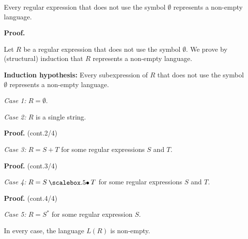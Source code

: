 \begin{frame}
  \begin{lemma}
    Every regular expression that does not use the symbol $\emptyset$
    represents a non-empty language.
  \end{lemma}

  {\bf Proof.}
  
  \pause

  Let $R$ be a regular expression that does not use the symbol
  $\emptyset$.  We prove by (structural) induction that $R$ represents
  a non-empty language.

  \pause

  {\bf Induction hypothesis:} Every subexpression of $R$ that does not
  use the symbol $\emptyset$ represents a non-empty language.
  
  \pause

  {\em Case 1:} $R=\emptyset$.
  \vspace{0.5in}

  \pause

  {\em Case 2:} $R$ is a single string.

  \pause
  \vspace{1.5in}
  
\end{frame}

\begin{frame}{}
  
  {\bf Proof.} (cont.2/4)
  
  {\em Case 3:} $R=S+T$ for some regular expressions $S$ and $T$.

  \vspace{2.5in}
\end{frame}

\begin{frame}{}
  
  {\bf Proof.} (cont.3/4)

  {\em Case 4:} $R=S\sbullet T$ for some regular expressions $S$ and $T$.

  \vspace{2.5in}
\end{frame}

\begin{frame}{}
  
  {\bf Proof.} (cont.4/4)

  {\em Case 5:} $R=S^*$ for some regular expression $S$.

  \vspace{2.5in}
  \pause

  In every case, the language $L(R)$ is non-empty.
\end{frame}


